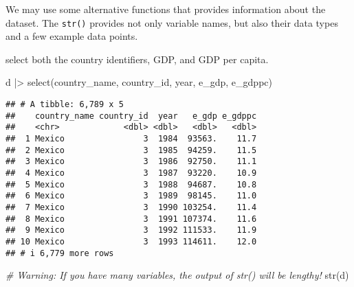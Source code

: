 \documentclass[
]{article}
\newenvironment{Shaded}{\begin{snugshade}}{\end{snugshade}}
\newcommand{\CommentTok}[1]{\textcolor[rgb]{0.56,0.35,0.01}{\textit{#1}}}
\newcommand{\FunctionTok}[1]{\textcolor[rgb]{0.00,0.00,0.00}{#1}}
\newcommand{\NormalTok}[1]{#1}
\newcommand{\SpecialCharTok}[1]{\textcolor[rgb]{0.00,0.00,0.00}{#1}}
\begin{document}
We may use some alternative functions that provides information about
the dataset. The \texttt{str()} provides not only variable names, but
also their data types and a few example data points.

select both the country identifiers, GDP, and GDP per capita.

\begin{Shaded}
\begin{Highlighting}[]
\NormalTok{d }\SpecialCharTok{|\textgreater{}} \FunctionTok{select}\NormalTok{(country\_name, country\_id, year, e\_gdp, e\_gdppc)}
\end{Highlighting}
\end{Shaded}

\begin{verbatim}
## # A tibble: 6,789 x 5
##    country_name country_id  year   e_gdp e_gdppc
##    <chr>             <dbl> <dbl>   <dbl>   <dbl>
##  1 Mexico                3  1984  93563.    11.7
##  2 Mexico                3  1985  94259.    11.5
##  3 Mexico                3  1986  92750.    11.1
##  4 Mexico                3  1987  93220.    10.9
##  5 Mexico                3  1988  94687.    10.8
##  6 Mexico                3  1989  98145.    11.0
##  7 Mexico                3  1990 103254.    11.4
##  8 Mexico                3  1991 107374.    11.6
##  9 Mexico                3  1992 111533.    11.9
## 10 Mexico                3  1993 114611.    12.0
## # i 6,779 more rows
\end{verbatim}

\begin{Shaded}
\begin{Highlighting}[]
\CommentTok{\# Warning: If you have many variables, the output of str() will be lengthy!}
\FunctionTok{str}\NormalTok{(d)}
\end{Highlighting}
\end{Shaded}
\end{document}
